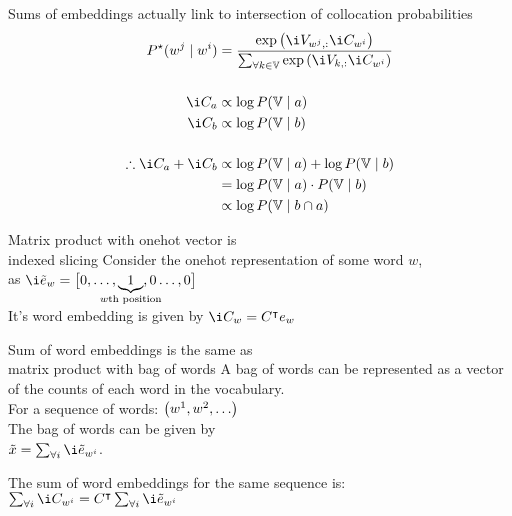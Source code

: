 \documentclass[dvipsnames]{beamer}
\renewcommand{\emph}{\alert}
\begin{document}
\begin{frame}{Sums of embeddings actually link to intersection of collocation probabilities}
\vspace{-0.5cm}
\begin{align*}
P^\star(\n w_j \mid \n w_i)
&=\frac{\exp{\i V_{\n w_j, :} \i C_{\n w_i}}}%
{\sum_{\forall k \in \set V} \exp{\i V_{k, :} \i C_{\n w_i}}}
\\[0.5cm]
%
\i C_a &\propto \log P(\set V \mid a)\\
\i C_b &\propto \log P(\set V \mid b)\\[0.5cm]
%
\therefore \i C_a + \i C_b &\propto \log P(\set V \mid a) + \log P(\set V \mid b) \\
&= \log P(\set V \mid a) \cdot P(\set V \mid b)\\
&\propto  \log P(\set V \mid b \cap a)
\end{align*}

\end{frame}


\begin{frame}{Matrix product with onehot vector is\\ indexed slicing}
	Consider the \emph{onehot} representation of some word $w$,\\
	as $\iv e_w=\big[0, \ldots, \underbrace{1}_{\mathclap{w\text{th position}}},0 \ldots, 0\big]$\\
	\vspace{0.5cm}
	It's word embedding is given by
	$\i C_{w} = C^\intercal e_w$
\end{frame}



\begin{frame}{Sum of word embeddings is the same as \\ matrix product with bag of words}
	A bag of words can be represented as a vector of the counts of each word in the vocabulary.\\ \vspace{0.5cm}
	For a sequence of words: $\left(\n w_1, \n w_2, \ldots \right)$ \\\vspace{0.5cm}
	The\emph{ bag of words} can be given by\\ $\v x = \sum_{\forall i} \iv e_{\n w_i}$.\\\vspace{0.5cm}
	
	The \emph{sum of word embeddings} for the same sequence is:
	$\sum_{\forall i} \i C_{\n w_i} = C^\intercal \sum_{\forall i} \iv e_{\n w_i}$
\end{frame}
\end{document}
